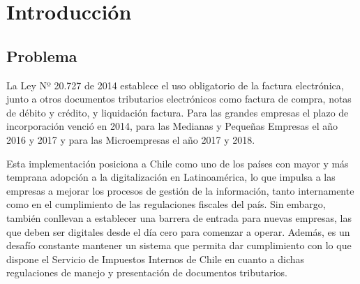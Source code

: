 \chapter{Introducción}

\section{Problema}

La Ley Nº 20.727 de 2014 establece el uso obligatorio de la factura electrónica, junto a otros documentos tributarios electrónicos como factura de compra, notas de débito y crédito, y liquidación factura. Para las grandes empresas el plazo de incorporación venció en 2014, para las Medianas y Pequeñas Empresas el año 2016 y 2017 y para las Microempresas el año 2017 y 2018.

Esta implementación posiciona a Chile como uno de los países con mayor y más temprana adopción a la digitalización en Latinoamérica, lo que impulsa a las empresas a mejorar los procesos de gestión de la información, tanto internamente como en el cumplimiento de las regulaciones fiscales del país. Sin embargo, también conllevan a establecer una barrera de entrada para nuevas empresas, las que deben ser digitales desde el día cero para comenzar a operar. Además, es un desafío constante mantener un sistema que permita dar cumplimiento con lo que dispone el Servicio de Impuestos Internos de Chile en cuanto a dichas regulaciones de manejo y presentación de documentos tributarios.

